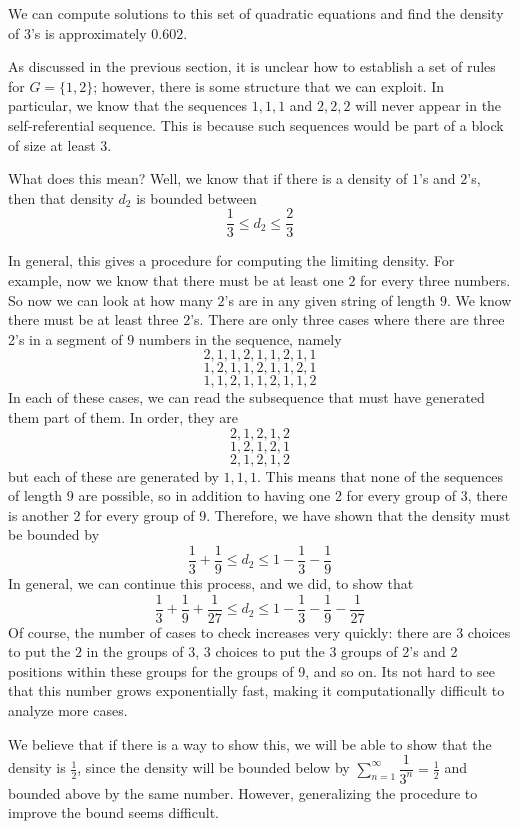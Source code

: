 \documentclass[runningheads,a4paper]{llncs}
\begin{document}
We can compute solutions to this set of quadratic equations and find the density of 3's is approximately $0.602$.

As discussed in the previous section, it is unclear how to establish a set of rules for $G = \{1 , 2\}$; however, there is some structure that we can exploit. In particular, we know that the sequences $1, 1, 1$ and $2, 2, 2$ will never appear in the self-referential sequence. This is because such sequences would be part of a block of size at least $3$. 

What does this mean? Well, we know that if there is a density of $1$'s and $2$'s, then that density $d_2$ is bounded between 
\[ \dfrac{1}{3} \leq d_2 \leq \dfrac{2}{3} \]

In general, this gives a procedure for computing the limiting density. For example, now we know that there must be at least one $2$ for every three numbers. So now we can look at how many $2$'s are in any given string of length $9$. We know there must be at least three $2$'s. There are only three cases where there are three 2's in a segment of $9$ numbers in the sequence, namely
\[ 2, 1, 1, 2, 1, 1 ,2 , 1, 1 \]
\[ 1, 2, 1, 1, 2, 1, 1, 2, 1 \]
\[ 1, 1, 2, 1, 1, 2, 1, 1, 2 \]
In each of these cases, we can read the subsequence that must have generated them part of them. In order, they are
\[ 2, 1, 2, 1, 2 \]
\[ 1, 2, 1, 2, 1\]
\[ 2, 1, 2, 1, 2 \]
but each of these are generated by $1, 1, 1$. This means that none of the sequences of length 9 are possible, so in addition to having one 2 for every group of 3, there is another 2 for every group of 9. Therefore, we have shown that the density must be bounded by
\[ \dfrac{1}{3} + \dfrac{1}{9} \leq d_2 \leq 1 - \dfrac{1}{3} - \dfrac{1}{9} \]
In general, we can continue this process, and we did, to show that
\[ \dfrac{1}{3} + \dfrac{1}{9} + \dfrac{1}{27} \leq d_2 \leq 1 - \dfrac{1}{3} - \dfrac{1}{9} - \dfrac{1}{27} \]
Of course, the number of cases to check increases very quickly: there are $3$ choices to put the $2$ in the groups of $3$, $3$ choices to put the 3 groups of 2's and 2 positions within these groups for the groups of 9, and so on. Its not hard to see that this number grows exponentially fast, making it computationally difficult to analyze more cases.

We believe that if there is a way to show this, we will be able to show that the density is $\frac{1}{2}$, since the density will be bounded below by $\sum_{n=1}^\infty \dfrac{1}{3^n} = \frac{1}{2}$ and bounded above by the same number. However, generalizing the procedure to improve the bound seems difficult.
\end{document}

